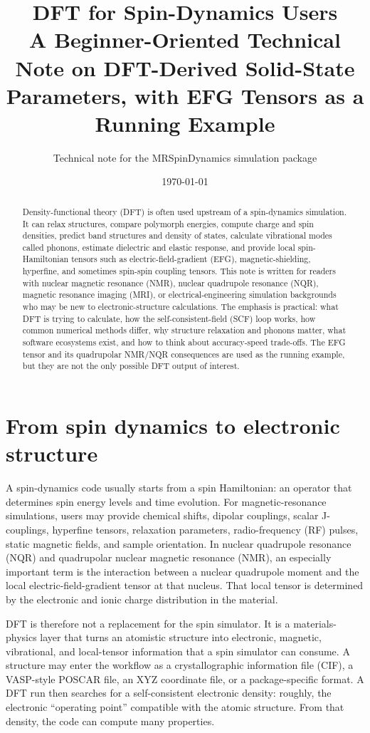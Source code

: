 \documentclass[11pt]{article}
\title{DFT for Spin-Dynamics Users\\
\large A Beginner-Oriented Technical Note on DFT-Derived Solid-State Parameters, with EFG Tensors as a Running Example}
\author{Technical note for the MRSpinDynamics simulation package}
\date{\today}
\begin{document}
\maketitle

\begin{abstract}
Density-functional theory (DFT) is often used upstream of a spin-dynamics simulation.  It can relax structures, compare polymorph energies, compute charge and spin densities, predict band structures and density of states, calculate vibrational modes called phonons, estimate dielectric and elastic response, and provide local spin-Hamiltonian tensors such as electric-field-gradient (EFG), magnetic-shielding, hyperfine, and sometimes spin-spin coupling tensors.  This note is written for readers with nuclear magnetic resonance (NMR), nuclear quadrupole resonance (NQR), magnetic resonance imaging (MRI), or electrical-engineering simulation backgrounds who may be new to electronic-structure calculations.  The emphasis is practical: what DFT is trying to calculate, how the self-consistent-field (SCF) loop works, how common numerical methods differ, why structure relaxation and phonons matter, what software ecosystems exist, and how to think about accuracy-speed trade-offs.  The EFG tensor and its quadrupolar NMR/NQR consequences are used as the running example, but they are not the only possible DFT output of interest.
\end{abstract}

\tableofcontents

\section{From spin dynamics to electronic structure}

A spin-dynamics code usually starts from a spin Hamiltonian: an operator that determines spin energy levels and time evolution.  For magnetic-resonance simulations, users may provide chemical shifts, dipolar couplings, scalar J-couplings, hyperfine tensors, relaxation parameters, radio-frequency (RF) pulses, static magnetic fields, and sample orientation.  In nuclear quadrupole resonance (NQR) and quadrupolar nuclear magnetic resonance (NMR), an especially important term is the interaction between a nuclear quadrupole moment and the local electric-field-gradient tensor at that nucleus.  That local tensor is determined by the electronic and ionic charge distribution in the material.

DFT is therefore not a replacement for the spin simulator.  It is a materials-physics layer that turns an atomistic structure into electronic, magnetic, vibrational, and local-tensor information that a spin simulator can consume.  A structure may enter the workflow as a crystallographic information file (CIF), a VASP-style POSCAR file, an XYZ coordinate file, or a package-specific format.  A DFT run then searches for a self-consistent electronic density: roughly, the electronic ``operating point'' compatible with the atomic structure.  From that density, the code can compute many properties.
\end{document}

